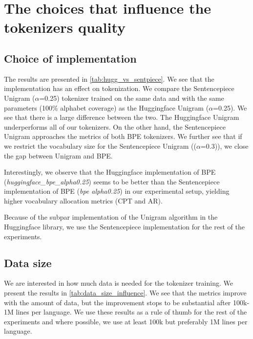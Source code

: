 \section{The choices that influence the tokenizers quality}

\subsection{Choice of implementation}
\label{sec:implementation}



The results are presented in \autoref{tab:hugg_vs_sentpiece}. We see that the implementation has an effect on tokenization. We compare the Sentencepiece Unigram ($\alpha$=0.25) tokenizer trained on the same data and with the same parameters (100\% alphabet coverage) as the Huggingface Unigram ($\alpha$=0.25). We see that there is a large difference between the two. The Huggingface Unigram underperforms all of our tokenizers. On the other hand, the Sentencepiece Unigram approaches the metrics of both BPE tokenizers. We further see that if we restrict the vocabulary size for the Sentencepiece Unigram (($\alpha$=0.3)), we close the gap between Unigram and BPE. 

Interestingly, we observe that the Huggingface implementation of BPE (\textit{huggingface\_bpe\_alpha0.25}) seems to be better than the Sentencepiece implementation of BPE (\textit{bpe alpha0.25}) in our experimental setup, yielding higher vocabulary allocation metrics (CPT and AR).

Because of the subpar implementation of the Unigram algorithm in the Huggingface library, we use the Sentencepiece implementation for the rest of the experiments.

\subsection{Data size}
\label{sec:data_size}



We are interested in how much data is needed for the tokenizer training. We present the results in \autoref{tab:data_size_influence}. We see that the metrics improve with the amount of data, but the improvement stops to be substantial after 100k-1M lines per language. We use these results as a rule of thumb for the rest of the experiments and where possible, we use at least 100k but preferably 1M lines per language.

